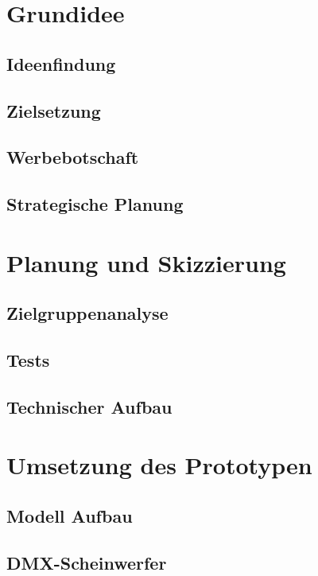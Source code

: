 







\tableofcontents
\clearpage



\section{Grundidee}
\subsection{Ideenfindung}
\subsection{Zielsetzung}
\subsection{Werbebotschaft}
\subsection{Strategische Planung}

\section{Planung und Skizzierung}
\subsection{Zielgruppenanalyse}
\subsection{Tests}
\subsection{Technischer Aufbau}

\section{Umsetzung des Prototypen}
\subsection{Modell Aufbau}
\subsection{DMX-Scheinwerfer}
